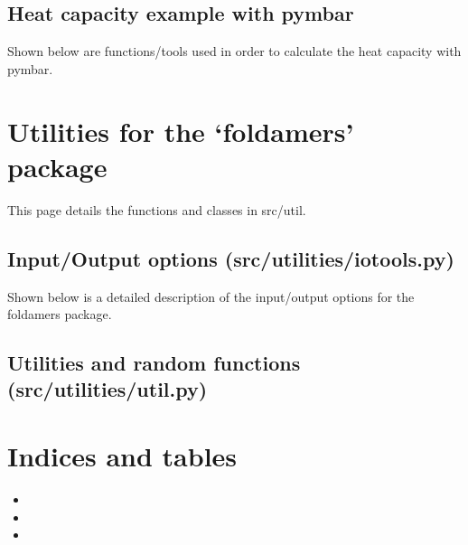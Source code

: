 \documentclass[letterpaper,10pt,english,openany,oneside]{sphinxmanual}
\begin{document}
\section{Heat capacity example with pymbar}
\label{\detokenize{thermo:heat-capacity-example-with-pymbar}}
Shown below are functions/tools used in order to calculate
the heat capacity with pymbar.


\chapter{Utilities for the ‘foldamers’ package}
\label{\detokenize{util:utilities-for-the-foldamers-package}}\label{\detokenize{util::doc}}
This page details the functions and classes in src/util.


\section{Input/Output options (src/utilities/iotools.py)}
\label{\detokenize{util:input-output-options-src-utilities-iotools-py}}
Shown below is a detailed description of the input/output
options for the foldamers package.


\section{Utilities and random functions (src/utilities/util.py)}
\label{\detokenize{util:utilities-and-random-functions-src-utilities-util-py}}

\chapter{Indices and tables}
\label{\detokenize{index:indices-and-tables}}\begin{itemize}
\item {} 

\item {} 

\item {} 

\end{itemize}



\renewcommand{\indexname}{Index}
\printindex
\end{document}
